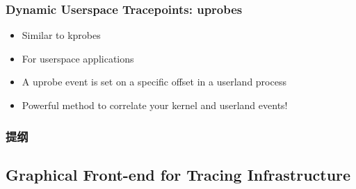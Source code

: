 \begin{frame}[fragile]
    \frametitle{Dynamic Userspace Tracepoints: uprobes}


    \begin{itemize}
        \item Similar to kprobes
        \item For userspace applications
        \item A uprobe event is set on a specific offset in a userland process
        \item Powerful method to correlate your kernel and userland events!
    \end{itemize}
% 
\end{frame}
\begin{frame}
\frametitle{提纲} %
\tableofcontents %
\end{frame}
\subsection{Graphical Front-end for Tracing Infrastructure}

